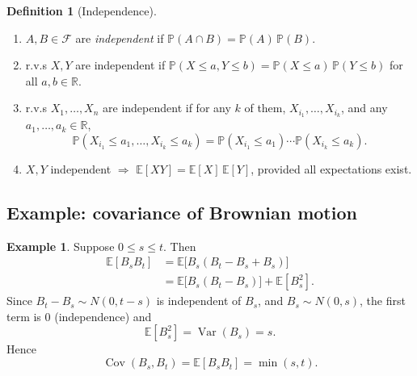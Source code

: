 \documentclass[11pt]{article}
\newcommand{\Prob}{\mathbb{P}}
\theoremstyle{definition}
\newtheorem{definition}{Definition}[section]
\newtheorem{example}{Example}[section]
\begin{document}
\begin{definition}[Independence]
\begin{enumerate}
  \item[(i)] $A, B \in \mathcal{F}$ are \emph{independent} if
        $\Prob(A \cap B) = \Prob(A)\,\Prob(B)$.
  \item[(ii)] r.v.s $X, Y$ are independent if
        $\Prob(X \le a, Y \le b) = \Prob(X \le a)\,\Prob(Y \le b)$
        for all $a, b \in \mathbb{R}$.
  \item[(iii)] r.v.s $X_1, \dots, X_n$ are independent if for any $k$ of
        them, $X_{i_1}, \dots, X_{i_k}$, and any $a_1, \dots, a_k \in \mathbb{R}$,
        \[
          \Prob(X_{i_1} \le a_1, \dots, X_{i_k} \le a_k)
          = \Prob(X_{i_1} \le a_1) \cdots \Prob(X_{i_k} \le a_k).
        \]
  \item[(iv)] $X, Y$ independent $\Rightarrow$ $\mathbb{E}[XY] =
        \mathbb{E}[X]\,\mathbb{E}[Y]$, provided all expectations exist.
\end{enumerate}
\end{definition}

\subsection*{Example: covariance of Brownian motion}

\begin{example}
Suppose $0 \le s \le t$. Then
\[
  \begin{aligned}
    \mathbb{E}[B_s B_t]
    &= \mathbb{E}\bigl[B_s (B_t - B_s + B_s)\bigr] \\
    &= \mathbb{E}\bigl[B_s (B_t - B_s)\bigr] + \mathbb{E}[B_s^2].
  \end{aligned}
\]
Since $B_t - B_s \sim N(0, t-s)$ is independent of $B_s$, and
$B_s \sim N(0, s)$, the first term is $0$ (independence) and
\[
  \mathbb{E}[B_s^2] = \operatorname{Var}(B_s) = s.
\]
Hence
\[
  \operatorname{Cov}(B_s, B_t) = \mathbb{E}[B_s B_t] = \min(s,t).
\]
\end{example}
\end{document}
